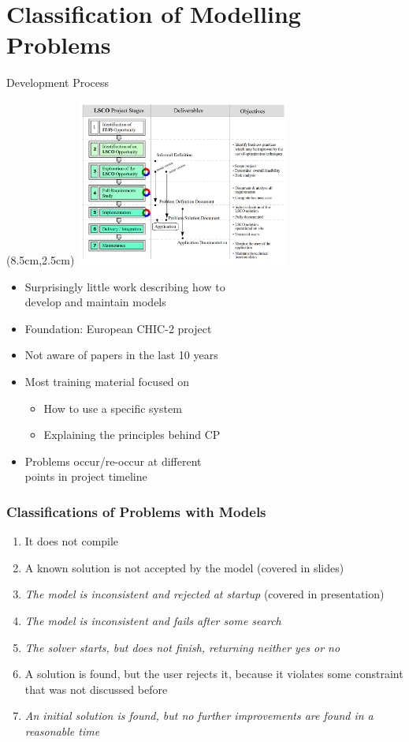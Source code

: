 \documentclass[dvipsnames,aspectratio=169]{beamer}
\begin{document}
\section{Classification of Modelling Problems}
\begin{frame}{Development Process}
\begin{textblock*}{7cm}(8.5cm,2.5cm)
\includegraphics[width=7cm]{images/chic2lifecycle.PNG}
\end{textblock*}
\begin{itemize}
    \item Surprisingly little work describing how to \\develop and maintain models
    \item Foundation: European CHIC-2 project \\\cite{DBLP:conf/dimacs/Gervet98}
    \item Not aware of papers in the last 10 years
    \item Most training material focused on 
    \begin{itemize}
        \item How to use a specific system
        \item Explaining the principles behind CP
    \end{itemize}
    \item Problems occur/re-occur at different\\ points in project timeline
\end{itemize}
\end{frame}

\begin{frame}
\frametitle{Classifications of Problems with Models}
\begin{enumerate}
\item \textcolor{black!50}{It does not compile}
\item A known solution is not accepted by the model (covered in slides)
\item \emph{The model is inconsistent and rejected at startup} (covered in presentation)
\item \emph{The model is inconsistent and fails after some search}
\item \emph{The solver starts, but does not finish, returning neither yes or no}
\item \textcolor{black!50}{A solution is found, but the user rejects it, because it violates some constraint that was not discussed before}
\item \emph{An initial solution is found, but no further improvements are found in a reasonable time}
\end{enumerate}
\end{frame}
\end{document}
